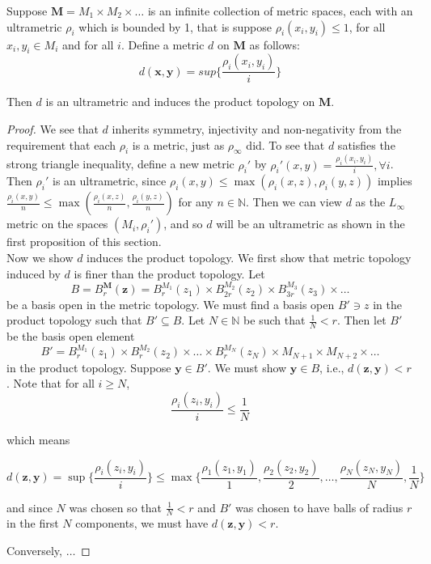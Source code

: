 \begin{proposition*}
Suppose $\textbf{M} = M_{1} \times M_{2} \times \ldots$ is an infinite collection of metric spaces, each with an ultrametric $\rho_i$ which is bounded by 1, that is suppose $\rho_i(x_i,y_i) \leq 1$, for all $x_i, y_i \in M_i$ and for all $i$. Define a metric $d$ on $\textbf{M}$ as follows: \[d(\textbf{x},\textbf{y}) = sup\{\frac{\rho_i(x_i,y_i)}{i}\}\]

Then $d$ is an ultrametric and induces the product topology on $\textbf{M}$.
\end{proposition*}

\begin{proof}
We see that $d$ inherits symmetry, injectivity and non-negativity from the requirement that each $\rho_i$ is a metric, just as $\rho_\infty$ did.  To see that $d$  satisfies the strong triangle inequality, define a new metric $\rho_i'$ by $\rho_i'(x,y)=\frac{\rho_i(x_i,y_i)}{i}, \forall i$. Then  $\rho_i'$ is an ultrametric, since $\rho_i(x,y) \leq \max(\rho_i(x,z), \rho_i(y,z))$ implies  $\frac{\rho_i(x,y)}{n} \leq \max(\frac{\rho_i(x,z)}{n}, \frac{\rho_i(y,z)}{n})$ for any $n \in \mathbb{N}$. Then we can view $d$ as the $L_\infty$ metric on the spaces $(M_i, \rho_i')$, and so $d$ will be an ultrametric as shown in the first proposition of this section.\\

Now we show $d$ induces the product topology. We first show that metric topology induced by $d$ is finer than the product topology. Let \[B=B_r^{\textbf{M}}(\textbf{z}) =  B_r^{M_1}(z_1) \times B_{2r}^{M_2}(z_2)  \times B_{3r}^{M_3}(z_3) \times \ldots  \] be a basis open in the metric topology. We must find a basis open $B' \ni z$ in the product topology such that $B' \subseteq B$. Let $N \in \mathbb{N}$ be such that $\frac{1}{N} < r$. Then let $B'$ be the basis open element \[B' = B_r^{M_1}(z_1) \times B_r^{M_2}(z_2) \times \ldots \times B_r^{M_N}(z_N) \times M_{N+1} \times M_{N+2} \times \ldots \] in the product topology. Suppose $\textbf{y} \in B'$. We must show $\textbf{y} \in B$, i.e., $d(\textbf{z}, \textbf{y}) < r$. Note that for all $i \geq N$, 
\[\frac{\rho_i(z_i, y_i)}{i} \leq \frac{1}{N}\]

which means 

 \[d(\textbf{z},\textbf{y}) = \sup\{\frac{\rho_i(z_i,y_i)}{i}\} \leq \max\{\frac{\rho_1(z_1,y_1)}{1}, \frac{\rho_2(z_2,y_2)}{2}, \ldots, \frac{\rho_N(z_N,y_N)}{N}, \frac{1}{N}\}\]

and since $N$ was chosen so that $\frac{1}{N} < r$ and $B'$ was chosen to have balls of radius $r$ in the first $N$ components, we must have $d(\textbf{z}, \textbf{y}) < r$.

Conversely, $\ldots$
\end{proof}

